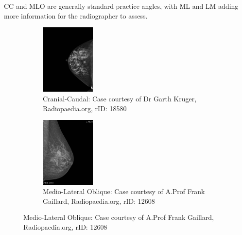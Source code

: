 CC and MLO are generally standard practice angles, with ML and LM adding more information for the radiographer to assess.
\begin{figure}[H]
\begin{center}
  \begin{subfigure}[t]{0.45\textwidth}
    \centering
        \includegraphics[height=3.5cm]{Chapter1/background-img/CC.jpg}
        \caption{Cranial-Caudal: Case courtesy of Dr Garth Kruger, Radiopaedia.org, rID: 18580}
        \label{fig:CC}
    \end{subfigure}
    \hfill
    \begin{subfigure}[t]{0.45\textwidth}
      \centering
          \includegraphics[height=3.5cm]{Chapter1/background-img/MLO.jpg}
          \caption{Medio-Lateral Oblique: Case courtesy of A.Prof Frank Gaillard, Radiopaedia.org, rID: 12608}
          \label{fig:MLO}
    \end{subfigure}
    \hspace*{\fill}



\end{center}
\end{figure}
